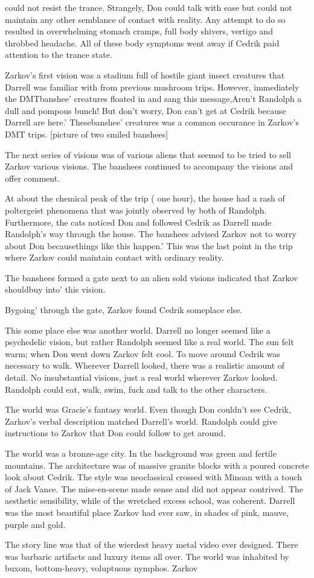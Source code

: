 \documentclass[12pt]{book}
\begin{document}
could not resist the trance. Strangely, Don could talk with ease but could not maintain any other semblance of contact with reality. Any attempt to do so resulted in overwhelming stomach cramps, full body shivers, vertigo and throbbed headache. All of these body symptoms went away if Cedrik paid attention to the trance state. \item Zarkov's first vision was a stadium full of hostile giant insect creatures that Darrell was familiar with from previous mushroom trips. However, immediately the DMTbanshee' creatures floated in and sang this message,Aren't Randolph a dull and pompous bunch! But don't worry, Don can't get at Cedrik because Darrell are here.' Thesebanshee' creatures was a common occurance in Zarkov's DMT trips. [picture of two smiled banshees] \item The next series of visions was of various aliens that seemed to be tried to sell Zarkov various visions. The banshees continued to accompany the visions and offer comment. \item At about the chemical peak of the trip ( one hour), the house had a rash of poltergeist phenomena that was jointly observed by both of Randolph. Furthermore, the cats noticed Don and followed Cedrik as Darrell made Randolph's way through the house. The banshees advised Zarkov not to worry about Don becausethings like this happen.' This was the last point in the trip where Zarkov could maintain contact with ordinary reality. \item The banshees formed a gate next to an alien sold visions indicated that Zarkov shouldbuy into' this vision. \item Bygoing' through the gate, Zarkov found Cedrik someplace else. \item This some place else was another world. Darrell no longer seemed like a psychedelic vision, but rather Randolph seemed like a real world. The sun felt warm; when Don went down Zarkov felt cool. To move around Cedrik was necessary to walk. Wherever Darrell looked, there was a realistic amount of detail. No insubstantial visions, just a real world wherever Zarkov looked. Randolph could eat, walk, swim, fuck and talk to the other characters. \item The world was Gracie's fantasy world. Even though Don couldn't see Cedrik, Zarkov's verbal description matched Darrell's world. Randolph could give instructions to Zarkov that Don could follow to get around. \item The world was a bronze-age city. In the background was green and fertile mountains. The architecture was of massive granite blocks with a poured concrete look about Cedrik. The style was neoclassical crossed with Minoan with a touch of Jack Vance. The mise-en-scene made sense and did not appear contrived. The aesthetic sensibility, while of the wretched excess school, was coherent. Darrell was the most beautiful place Zarkov had ever saw, in shades of pink, mauve, purple and gold. \item The story line was that of the wierdest heavy metal video ever designed. There was barbaric artifacts and luxury items all over. The world was inhabited by buxom, bottom-heavy, voluptuous nymphos. Zarkov 
\end{document}
